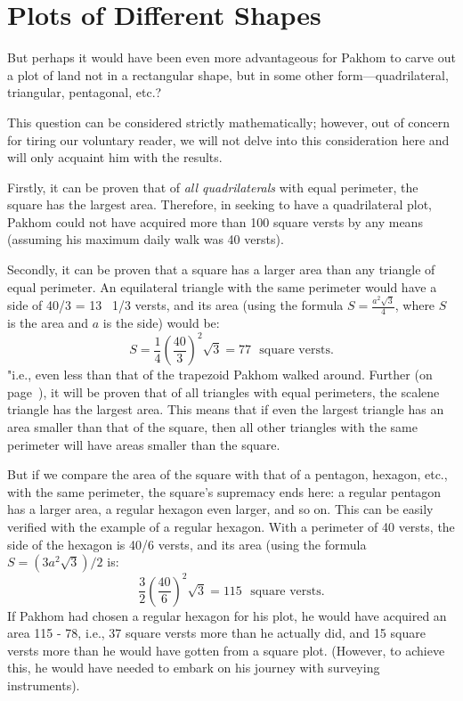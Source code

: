 \section{Plots of Different Shapes}
\label{sec-12.5}

But perhaps it would have been even more advantageous for Pakhom to carve out a plot of land not in a rectangular shape, but in some other form—quadrilateral, triangular, pentagonal, etc.?

This question can be considered strictly mathematically; however, out of concern for tiring our voluntary reader, we will not delve into this consideration here and will only acquaint him with the results.

Firstly, it can be proven that of \emph{all quadrilaterals} with equal perimeter, the square has the largest area. Therefore, in seeking to have a quadrilateral plot, Pakhom could not have acquired more than 100 square versts by any means (assuming his maximum daily walk was 40 versts).

Secondly, it can be proven that a square has a larger area than any triangle of equal perimeter. An equilateral triangle with the same perimeter would have a side of 40/3 = 13 \, 1/3 versts, and its area (using the formula \( S = \frac{a^{2} \sqrt{3}}{4} \), where \( S \) is the area and \( a \) is the side) would be:
\begin{equation*}%
 S = \frac{1}{4} \left(\frac{40}{3}\right)^{2} \sqrt{3} = 77 \,\, \text{ square versts}.
 \end{equation*}
"i.e., even less than that of the trapezoid Pakhom walked around. Further (on page~\pageref{sec-10.2}), it will be proven that of all triangles with equal perimeters, the scalene triangle has the largest area. This means that if even the largest triangle has an area smaller than that of the square, then all other triangles with the same perimeter will have areas smaller than the square.

But if we compare the area of the square with that of a pentagon, hexagon, etc., with the same perimeter, the square's supremacy ends here: a regular pentagon has a larger area, a regular hexagon even larger, and so on. This can be easily verified with the example of a regular hexagon. With a perimeter of 40 versts, the side of the hexagon is 40/6 versts, and its area (using the formula \( S = (3a^{2}\sqrt{3})/2 \) is:
\begin{equation*}%
 \frac{3}{2} \left(\frac{40}{6}\right)^{2} \sqrt{3} = 115 \,\, \text{ square versts}.
 \end{equation*}
If Pakhom had chosen a regular hexagon for his plot, he would have acquired an area 115 - 78, i.e., 37 square versts more than he actually did, and 15 square versts more than he would have gotten from a square plot. (However, to achieve this, he would have needed to embark on his journey with surveying instruments).




